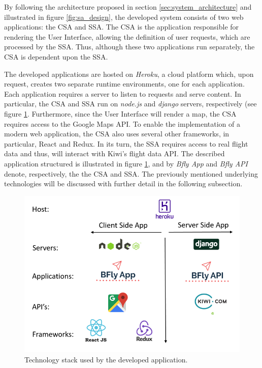 By following the architecture proposed in section \ref{sec:system_architecture} and illustrated in figure \ref{fig:sa_design}, the developed system consists of two web applications: the CSA and SSA. The CSA is the application responsible for rendering the User Interface, allowing the definition of user requests, which are processed by the SSA. Thus, although these two applications run separately, the CSA is dependent upon the SSA. 



The developed applications are hosted on \textit{Heroku}, a cloud platform which, upon request, creates two separate runtime environments, one for each application. Each application requires a server to listen to requests and serve content. In particular, the CSA and SSA run on \textit{node.js} and \textit{django} servers, respectively (see figure \ref{fig:sa_structure}. Furthermore, since the User Interface will render a map, the CSA requires access to the Google Maps API. To enable the implementation of a modern web application, the CSA also uses several other frameworks, in particular, React and Redux. In its turn, the SSA requires access to real flight data and thus, will interact with Kiwi's flight data API. The described application structured is illustrated in figure \ref{fig:sa_structure}, and by \textit{Bfly App} and \textit{Bfly API} denote, respectively, the the CSA and SSA. The previously mentioned underlying technologies will be discussed with further detail in the following subsection.  



\begin{figure}[htpb]
  \centering
  \includegraphics[width=.7\textwidth]{./Figures/system_implementation/stack.png}
  \caption{Technology stack used by the developed application.}
  \label{fig:sa_structure}  
\end{figure}


